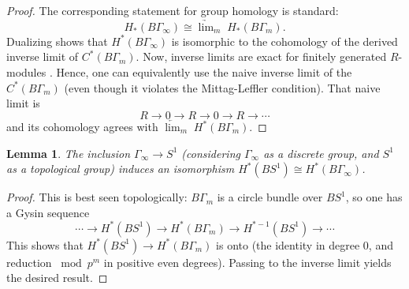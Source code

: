 \documentclass[10pt,a4paper]{amsart}
\theoremstyle{plain}
\newtheorem{lemma}[theorem]{Lemma}
\theoremstyle{definition}
\let\iso\cong
\begin{document}
\begin{proof}
The corresponding statement for group homology is standard:
\begin{equation*}
H_*(B\Gamma_\infty) \iso \underrightarrow{\lim}_m \;H_*(B\Gamma_m).
\end{equation*}
Dualizing shows that $H^*(B\Gamma_\infty)$ is isomorphic to the cohomology of the derived inverse limit of $C^*(B\Gamma_m)$. Now, inverse limits are exact for finitely generated $R$-modules \cite[Th.\,1]{jensen70}. Hence, one can equivalently use the naive inverse limit of the $C^*(B\Gamma_m)$ (even though it violates the Mittag-Leffler condition). That naive limit is
\begin{equation*}
R \to 0 \to R \to 0 \to R \to \cdots
\end{equation*}
and its cohomology agrees with $\underleftarrow{\lim}_m \; H^*(B\Gamma_m)$.
\end{proof}

\begin{lemma}
The inclusion $\Gamma_\infty \to S^1$ (considering $\Gamma_\infty$ as a discrete group, and $S^1$ as a topological group) induces an isomorphism $H^*(BS^1) \iso H^*(B\Gamma_\infty)$.
\end{lemma}

\begin{proof}
This is best seen topologically: $B\Gamma_m$ is a circle bundle over $BS^1$, so one has a Gysin sequence
\begin{equation}\label{eq:gysin}
\cdots \to H^*(BS^1) \to H^*(B\Gamma_m) \to H^{*-1}(BS^1) \to \cdots
\end{equation}
This shows that $H^*(BS^1) \to H^*(B\Gamma_m)$ is onto (the identity in degree $0$, and reduction $\bmod p^m$ in positive even degrees). Passing to the inverse limit yields the desired result.
\end{proof}
\end{document}
